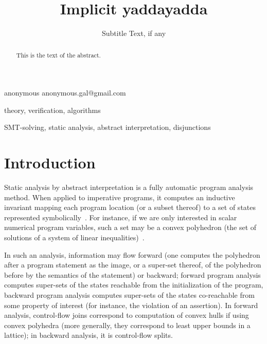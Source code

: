 \documentclass[preprint]{sigplanconf}
\begin{document}
\copyrightdata{[to be supplied]} 


\title{Implicit yaddayadda}
\subtitle{Subtitle Text, if any}

           {anonymous}
           {anonymous.gal@gmail.com}

\maketitle

\begin{abstract}
This is the text of the abstract.
\end{abstract}


\terms
theory, verification, algorithms

\keywords
SMT-solving, static analysis, abstract interpretation, disjunctions

\section{Introduction}
Static analysis by abstract interpretation is a fully automatic program analysis method. When applied to imperative programs, it computes an inductive invariant mapping each program location (or a subset thereof) to a set of states represented symbolically~\cite{CousotCousot_JLC92}.
For instance, if we are only interested in scalar numerical program variables, such a set may be a convex polyhedron (the set of solutions of a system of linear inequalities)~\cite{CousotHalbwachs78,PPL,BagnaraHZ08SCP}.

In such an analysis, information may flow forward (one computes the polyhedron after a program statement as the image, or a super-set thereof, of the polyhedron before by the semantics of the statement) or backward;
forward program analysis computes super-sets of the states reachable from the initialization of the program, backward program analysis computes super-sets of the states co-reachable from some property of interest (for instance, the violation of an assertion).
In forward analysis, control-flow joins correspond to computation of convex hulls if using convex polyhedra (more generally, they correspond to least upper bounds in a lattice); in backward analysis, it is control-flow splits.
\end{document}
